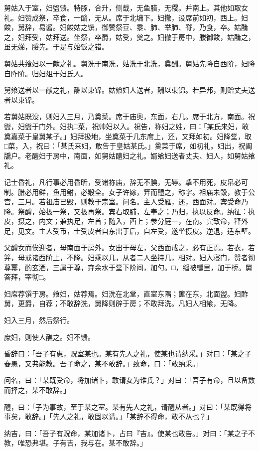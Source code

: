 \documentclass[]{article}
\begin{document}
舅姑入于室，妇盥馈。特豚，合升，侧载，无鱼腊，无稷。并南上。其他如取女礼。妇赞成祭，卒食，一酳，无从。席于北墉下。妇撤，设席前如初，西上。妇餕，舅辞，易酱。妇餕姑之馔，御赞祭豆、黍、肺、举肺、脊，乃食，卒。姑酳之，妇拜受，姑拜送。坐祭，卒爵，姑受，奠之。妇撤于房中，媵御餕，姑酳之，虽无娣，媵先。于是与始饭之错。

舅姑共飨妇以一献之礼。舅洗于南洗，姑洗于北洗，奠酬。舅姑先降自西阶，妇降自阼阶。归妇俎于妇氏人。

舅飨送者以一献之礼，酬以束锦。姑飨妇人送者，酬以束锦。若异邦，则赠丈夫送者以束锦。

若舅姑既没，则妇入三月，乃奠菜。席于庙奥，东面，右几。席于北方，南面。祝盥，妇盥于门外。妇执□菜，祝帅妇以入。祝告，称妇之姓，曰：「某氏来妇，敢奠嘉菜于皇舅某子。」妇拜扱地，坐奠菜于几东席上，还，又拜如初。妇降堂，取□菜，入，祝曰：「某氏来妇，敢告于皇姑某氏。」奠菜于席，如初礼。妇出，祝阖牖户。老醴妇于房中，南面，如舅姑醴妇之礼。婿飨妇送者丈夫、妇人，如舅姑飨礼。

记士昏礼，凡行事必用昏昕，受诸祢庙，辞无不腆，无辱。挚不用死，皮帛必可制。腊必用鲜，鱼用鲋，必殽全。女子许嫁，笄而醴之，称字。祖庙未毁，教于公宫，三月。若祖庙已毁，则教于宗室。问名。主人受雁，还，西面对。宾受命乃降。祭醴，始扱一祭，又扱再祭。宾右取脯，左奉之；乃归，执以反命。纳征：执皮，摄之，内文；兼执足，左首；随入，西上；参分庭一，在南。宾致命，释外足，见文。主人受币，士受皮者自东出于后，自左受，遂坐摄皮。逆退，适东壁。

父醴女而俟迎者，母南面于房外。女出于母左，父西面戒之，必有正焉。若衣，若笄，母戒诸西阶上，不降。妇乘以几，从者二人坐持几，相对。妇入寝门，赞者彻尊幂，酌玄酒，三属于尊，弃余水于堂下阶间，加勺。□，缁被纁里，加于桥。舅答拜，宰彻□。

妇席荐馔于房。飨妇，姑荐焉。妇洗在北堂，直室东隅；篚在东，北面盥。妇酢舅，更爵，自荐；不敢辞洗，舅降则辟于房；不敢拜洗。凡妇人相飨，无降。

妇入三月，然后祭行。

庶妇，则使人醮之。妇不馈。

昏辞曰：「吾子有惠，贶室某也。某有先人之礼，使某也请纳采。」对曰：「某之子舂愚，又弗能教。吾子命之，某不敢辞。」致命，曰：「敢纳采。」

问名，曰：「某既受命，将加诸卜，敢请女为谁氏？」对曰：「吾子有命，且以备数而择之，某不敢辞。」

醴，曰：「子为事故，至于某之室。某有先人之礼，请醴从者。」对曰：「某既得将事矣，敢辞。」「先人之礼，敢固以请。」「某辞不得命，敢不从也？」

纳吉，曰：「吾子有贶命，某加诸卜，占曰『吉』。使某也敢告。」对曰：「某之子不教，唯恐弗堪。子有吉，我与在。某不敢辞。」
\end{document}
